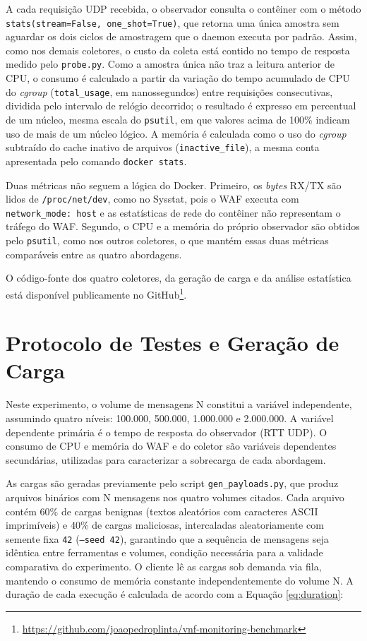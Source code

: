 A cada requisição UDP recebida, o observador consulta o contêiner com o método \texttt{stats(stream=\allowbreak False,\allowbreak{} one\_shot=\allowbreak True)}, que retorna uma única amostra sem aguardar os dois ciclos de amostragem que o daemon executa por padrão. Assim, como nos demais coletores, o custo da coleta está contido no tempo de resposta medido pelo \texttt{probe.py}. Como a amostra única não traz a leitura anterior de CPU, o consumo é calculado a partir da variação do tempo acumulado de CPU do \textit{cgroup} (\texttt{total\_usage}, em nanossegundos) entre requisições consecutivas, dividida pelo intervalo de relógio decorrido; o resultado é expresso em percentual de um núcleo, mesma escala do \texttt{psutil}, em que valores acima de 100\% indicam uso de mais de um núcleo lógico. A memória é calculada como o uso do \textit{cgroup} subtraído do cache inativo de arquivos (\texttt{inactive\_file}), a mesma conta apresentada pelo comando \texttt{docker stats}.

Duas métricas não seguem a lógica do Docker. Primeiro, os \textit{bytes} RX/TX são lidos de \texttt{/proc/net/dev}, como no Sysstat, pois o WAF executa com \texttt{network\_mode: host} e as estatísticas de rede do contêiner não representam o tráfego do WAF. Segundo, o CPU e a memória do próprio observador são obtidos pelo \texttt{psutil}, como nos outros coletores, o que mantém essas duas métricas comparáveis entre as quatro abordagens.

O código-fonte dos quatro coletores, da geração de carga e da análise estatística está disponível publicamente no GitHub\footnote{\url{https://github.com/joaopedroplinta/vnf-monitoring-benchmark}}.

\section{Protocolo de Testes e Geração de Carga}
\label{sec:protocolo}

Neste experimento, o volume de mensagens N constitui a variável independente, assumindo quatro níveis: 100.000, 500.000, 1.000.000 e 2.000.000. A variável dependente primária é o tempo de resposta do observador (RTT UDP). O consumo de CPU e memória do WAF e do coletor são variáveis dependentes secundárias, utilizadas para caracterizar a sobrecarga de cada abordagem.

As cargas são geradas previamente pelo script \texttt{gen\_payloads.py}, que produz arquivos binários com N mensagens nos quatro volumes citados. Cada arquivo contém 60\% de cargas benignas (textos aleatórios com caracteres ASCII imprimíveis) e 40\% de cargas maliciosas, intercaladas aleatoriamente com semente fixa \texttt{42} (\texttt{--seed 42}), garantindo que a sequência de mensagens seja idêntica entre ferramentas e volumes, condição necessária para a validade comparativa do experimento. O cliente lê as cargas sob demanda via fila, mantendo o consumo de memória constante independentemente do volume N. A duração de cada execução é calculada de acordo com a Equação \ref{eq:duration}:

